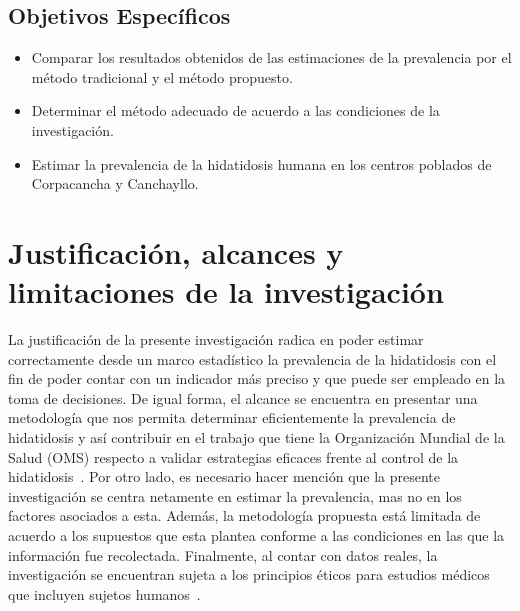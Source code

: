 \subsection{Objetivos Específicos}
\begin{itemize}
    \item Comparar los resultados obtenidos de las estimaciones de la prevalencia por el método tradicional y el método propuesto.
    \item Determinar el método adecuado de acuerdo a las condiciones de la investigación.
    \item Estimar la prevalencia de la hidatidosis humana en los centros poblados de Corpacancha y Canchayllo.
\end{itemize}
\newpage
\section{Justificación, alcances y limitaciones de la investigación}
La justificación de la presente investigación radica en poder estimar correctamente desde un marco estadístico la prevalencia de la hidatidosis con el fin de poder contar con un indicador más preciso y que puede ser empleado en la toma de decisiones. De igual forma, el alcance se encuentra en presentar una metodología que nos permita determinar eficientemente la prevalencia de hidatidosis y así contribuir en el trabajo que tiene la Organización Mundial de la Salud (OMS) respecto a validar estrategias eficaces frente al control de la hidatidosis~\cite{who2020}. Por otro lado, es necesario hacer mención que la presente investigación se centra netamente en estimar la prevalencia, mas no en los factores asociados a esta. Además, la metodología propuesta está limitada de acuerdo a los supuestos que esta plantea conforme a las condiciones en las que la información fue recolectada. Finalmente, al contar con datos reales, la investigación se encuentran sujeta a los principios éticos para estudios médicos que incluyen sujetos humanos~\cite{general2014world}. 


